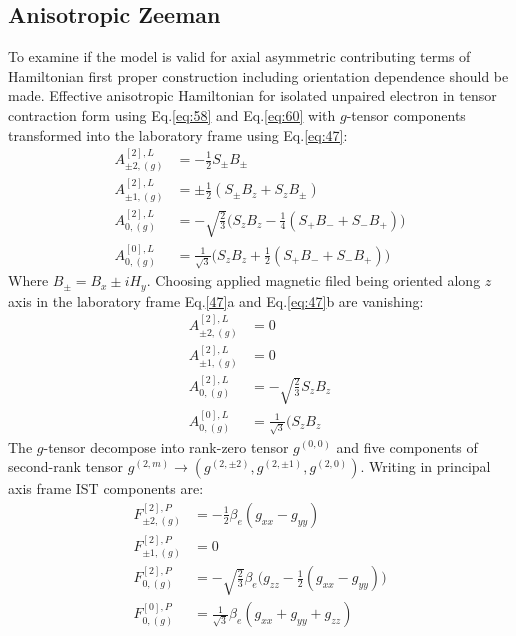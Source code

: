 \subsection{Anisotropic Zeeman}\label{zeemansection}
To examine if the model is valid for axial asymmetric contributing terms of Hamiltonian first proper construction including orientation dependence should be made. Effective anisotropic Hamiltonian for isolated unpaired electron in tensor contraction form using Eq.\ref{eq:58} and Eq.\ref{eq:60} with $g$-tensor components transformed into the laboratory frame\cite{NMRtomograph}\cite{Nordio} using Eq.\ref{eq:47}:
\begin{subequations}\label{eq:48}
\begin{align}
A^{[2],L}_{\pm2,(g)} & =-\frac{1}{2}S_{\pm}B_{\pm}\\
A^{[2],L}_{\pm1,(g)} & =\pm\frac{1}{2}(S_{\pm}B_{z}+S_zB_{\pm})\\
A^{[2],L}_{0,(g)} & =-\sqrt{\frac{2}{3}}\big(S_{z}B_{z}-\frac{1}{4}(S_+B_-+S_-B_+)\big)\\
A^{[0],L}_{0,(g)} & =\frac{1}{\sqrt{3}}\big(S_{z}B_{z}+\frac{1}{2}(S_+B_-+S_-B_+)\big)
\end{align}
\end{subequations}
Where $B_{\pm}=B_x\pm iH_y$. Choosing applied magnetic filed being oriented along $z$ axis in the laboratory frame  Eq.\ref{47}a and Eq.\ref{eq:47}b are vanishing: 
\begin{subequations}\label{eq:49}
\begin{align}
A^{[2],L}_{\pm2,(g)} & =0\\
A^{[2],L}_{\pm1,(g)} & =0\\
A^{[2],L}_{0,(g)} & =-\sqrt{\frac{2}{3}}S_{z}B_{z}\\
A^{[0],L}_{0,(g)} & = \frac{1}{\sqrt{3}}(S_{z}B_{z}
\end{align}
\end{subequations}
The $g$-tensor decompose into rank-zero tensor $g^{(0,0)}$ and five components of second-rank tensor $g^{(2,m)}\rightarrow(g^{(2,\pm2)}, g^{(2,\pm1)},g^{(2,0)})$. Writing in principal axis frame IST components are: 
\begin{subequations}\label{eq:50}
\begin{align}
F^{[2],P}_{\pm2,(g)} & =-\frac{1}{2}\beta_e(g_{xx}-g_{yy})\\
F^{[2],P}_{\pm1,(g)} & =0\\
F^{[2],P}_{0,(g)} & =-\sqrt{\frac{2}{3}}\beta_e\big(g_{zz}-\frac{1}{2}(g_{xx}-g_{yy})\big)\\
F^{[0],P}_{0,(g)} & = \frac{1}{\sqrt{3}}\beta_e(g_{xx}+g_{yy}+g_{zz})
\end{align}
\end{subequations}
